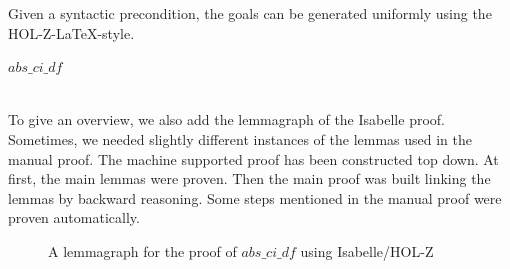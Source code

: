 Given a syntactic precondition, the goals can be generated uniformly using the HOL-Z-\LaTeX-style.\\[0.4cm]
%
%
%
\newsavebox{\sampleAbsCiDFBox}
\begin{lrbox}{\sampleAbsCiDFBox}
\begin{minipage}{.9\linewidth}
\ensuremath {abs\_ci\_df}\hfill \\
\end{minipage}
\end{lrbox}
\newcommand{\sampleAbsCiDF}{\usebox{\sampleAbsCiDFBox }}
%
\sampleAbsCiDF\mbox{}\\[0.4cm]
%
%
%
To give an overview, we also add the lemmagraph of the Isabelle proof.
Sometimes, we needed slightly different instances of the lemmas used in the
manual proof. The machine supported proof has been constructed top down. At
first, the main lemmas were proven. Then the main proof was built
linking the lemmas by backward reasoning. Some steps mentioned in
the manual proof were proven automatically.
% 
% 
\begin{figure}%
\caption{A lemmagraph for the proof of $abs\_ci\_df$ using Isabelle/HOL-Z}%
\end{figure}%
%
%
% 
%
\newpage

